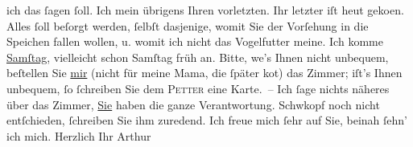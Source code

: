 \begin{ledgroupsized}[t]{13cm}
               ich das ſagen ſoll. Ich mein übrigens Ihren vorletzten. Ihr letzter iſt heut geko{\geminationm}en.\pend
           \pstart
           Alles ſoll beſorgt werden, ſelbſt dasjenige, womit Sie der Vorſehung in die Speichen
               fallen wollen, u. womit ich nicht das Vogel{\pb}futter meine.\pend
           \pstart
           Ich komme \uline{Samſtag}, vielleicht schon Samſtag früh an.
               Bitte, we{\geminationn}’s Ihnen nicht unbequem, beſtellen Sie \uline{mir} (nicht für meine Mama, die ſpäter ko{\geminationm}t) das
               Zimmer; iſt’s Ihnen unbequem, ſo ſchreiben Sie dem \textsc{Petter} eine {\pb}Karte. – Ich ſage nichts näheres
               über das Zimmer, \uline{Sie} haben die ganze
               Verantwortung.\pend
           \pstart
           Schwkopf noch nicht entſchieden, ſchreiben Sie
               ihm zuredend.\pend
           \pstart
           Ich freue mich ſehr auf Sie, beinah ſehn’ ich mich.\pend
           \pstart Herzlich Ihr \spacefill\mbox{Arthur}\pend{}\endnumbering{}\end{ledgroupsized}  \newcommand{\dateiname}{L00690}\newcommand{\titel}{Arthur Schnitzler an Richard Beer-Hofmann, 23. 6. 1897}\newcommand{\editorInnen}{Martin Anton Müller und Gerd-Hermann Susen}
            \footnotesize
\begin{ledgroupsized}[t]{11.5cm}
\end{ledgroupsized}
         
      